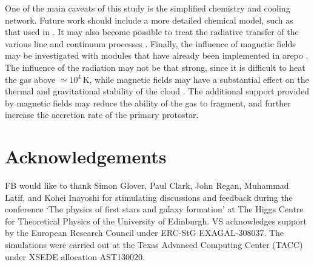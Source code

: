 \documentclass[useAMS,usenatbib]{mnras}
\begin{document}
One of the main caveats of this study is the simplified chemistry and cooling network. Future work should include a more detailed chemical model, such as that used in \citet{Inayoshi_2014}. It may also become possible to treat the radiative transfer of the various line and continuum processes \citep[e.g.][]{Greif_2014}. Finally, the influence of magnetic fields may be investigated with modules that have already been implemented in {\sc arepo} \citep{Pakmor_2011}. The influence of the radiation may not be that strong, since it is difficult to heat the gas above $\simeq 10^4\,$K, while magnetic fields may have a substantial effect on the thermal and gravitational stability of the cloud \citep[e.g.][]{Latif_2013c, Latif_2014b}. The additional support provided by magnetic fields may reduce the ability of the gas to fragment, and further increase the accretion rate of the primary protostar.

\section*{Acknowledgements}

FB would like to thank Simon Glover, Paul Clark, John Regan, Muhammad Latif, and Kohei Inayoshi for stimulating discussions and feedback during the conference `The physics of first stars and galaxy formation' at The Higgs Centre for Theoretical Physics of the University of Edinburgh. VS acknowledges support by the European Research Council under ERC-StG EXAGAL-308037. The simulations were carried out at the Texas Advanced Computing Center (TACC) under XSEDE allocation AST130020.

        
\end{document}
